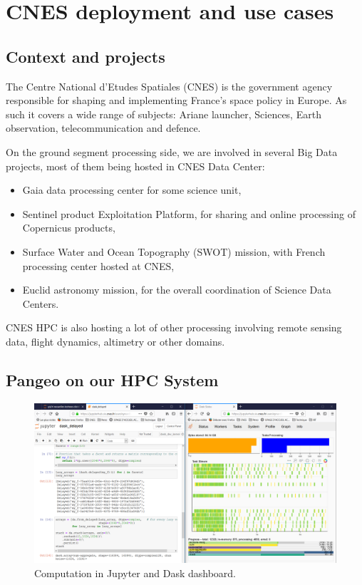 \documentclass{article}
\begin{document}
\section{CNES deployment and use cases}
\label{sec:cnes}

\subsection{Context and projects}
\label{ssec:context}

The Centre National d'Etudes Spatiales (CNES) is the government agency responsible for shaping and implementing France's space policy in Europe. As such it covers a wide range of subjects: Ariane launcher, Sciences, Earth observation, telecommunication and defence.

On the ground segment processing side, we are involved in several Big Data projects, most of them being hosted in CNES Data Center:
\begin{itemize}
\item Gaia data processing center for some science unit,
\item Sentinel product Exploitation Platform, for sharing and online processing of Copernicus products,
\item Surface Water and Ocean Topography (SWOT) mission, with French processing center hosted at CNES,
\item Euclid astronomy mission, for the overall coordination of Science Data Centers.
\end{itemize}

CNES HPC is also hosting a lot of other processing involving remote sensing data, flight dynamics, altimetry or other domains.

\subsection{Pangeo on our HPC System}
\label{ssec:pangeohpc}

\begin{figure}
  \centering
  \includegraphics[width=\columnwidth]{dask_jobqueue.png}
  \caption{\label{dask_jobqueue} Computation in Jupyter and Dask dashboard.}
\end{figure}
\end{document}
